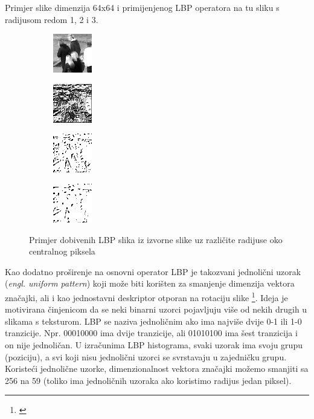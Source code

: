 \documentclass[times, utf8, zavrsni]{fer}
\begin{document}
Primjer slike dimenzija 64x64 i primijenjenog LBP operatora na tu 
sliku s radijusom redom 1, 2 i 3.

\begin{figure}[ht]
\begin{subfigure}[b]{0.24\linewidth}
\centering
\includegraphics{img/1.jpg}
\end{subfigure}
\begin{subfigure}[b]{0.24\linewidth}
\centering
\includegraphics{img/2.jpg}
\end{subfigure}
\begin{subfigure}[b]{0.24\linewidth}
\centering
\includegraphics{img/3.jpg}
\end{subfigure}
\begin{subfigure}[b]{0.24\linewidth}
\centering
\includegraphics{img/4.jpg}
\end{subfigure}

\caption{Primjer dobivenih LBP slika iz izvorne slike uz različite radijuse oko centralnog piksela}
\end{figure}

Kao dodatno proširenje na osnovni operator LBP je takozvani jednolični uzorak 
(\textit{engl. uniform pattern}) koji može biti korišten za smanjenje dimenzija
vektora značajki, ali i kao jednostavni deskriptor otporan na rotaciju slike 
\footnote{\cite{barkan}}. Ideja je motivirana činjenicom da se neki 
binarni uzorci pojavljuju više od nekih drugih u slikama s teksturom. 
LBP se naziva jednoličnim ako ima najviše dvije 0-1 ili 1-0 tranzicije.
 Npr. 00010000 ima dvije tranzicije, ali 01010100 ima šest tranzicija 
 i on nije jednoličan. U izračunima LBP histograma, svaki uzorak ima 
 svoju grupu (poziciju), a svi koji nisu jednolični uzorci se 
 svrstavaju u zajedničku grupu. Koristeći jednolične uzorke,
  dimenzionalnost vektora značajki možemo smanjiti sa 256 na 59 
  (toliko ima jednoličnih uzoraka ako koristimo radijus jedan piksel).
\end{document}
